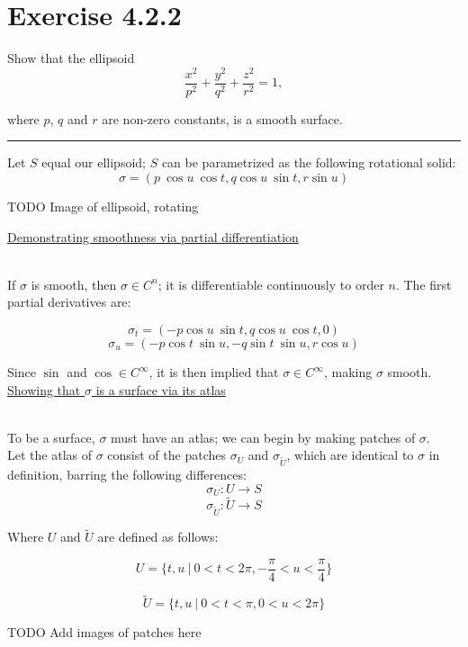 \documentclass[12pt]{article}
\newcommand{\ulind}[1]
{
\noindent
\underline{#1}\\\\
\indent
}
\begin{document}
\maketitle

\section*{Exercise 4.2.2}
Show that the ellipsoid
$$
\frac{x^2}{p^2} + \frac{y^2}{q^2} + \frac{z^2}{r^2} = 1,
$$

where $p$, $q$ and $r$ are non-zero constants, is a smooth surface.

\vspace{1cm}
\hrule
\vspace{1cm}
\noindent

Let $S$ equal our ellipsoid; $S$ can be parametrized as the following rotational solid:
$$
\sigma = (p \ \cos u \ \cos t, q \cos u \ \sin t, r \sin u)
$$

TODO
Image of ellipsoid, rotating

\ulind{Demonstrating smoothness via partial differentiation}
If $\sigma$ is smooth, then $\sigma \in C^n$; it is differentiable continuously to order $n$. The first partial derivatives are:

$$
\sigma_t = (-p \cos u \ \sin t, q \cos u \ \cos t, 0)
$$
$$
\sigma_u = (-p \cos t \ \sin u, -q \sin t \ \sin u, r \cos u)
$$

Since $\sin $ and $\cos \in C^\infty$, it is then implied that $\sigma \in C^\infty$, making $\sigma$ smooth.\\

\ulind{Showing that $\sigma$ is a surface via its atlas}
To be a surface, $\sigma$ must have an atlas; we can begin by making patches of $\sigma$.\\

\clearpage 
Let the atlas of $\sigma$ consist of the patches $\sigma_U$ and $\sigma_{\widetilde U}$, which are identical to $\sigma$ in definition, barring the following differences:\\

$$
\sigma_{U} : U \rightarrow S
$$
$$
\sigma_{\widetilde U} : \widetilde U \rightarrow S
$$

Where $U$ and $\widetilde U$ are defined as follows:

$$
U = \lbrace t, u \ | \ 0 < t < 2 \pi, -\frac{\pi}{4} < u < \frac{\pi}{4} \rbrace
$$

$$
\widetilde U = \lbrace t, u \ | \ 0 < t < \pi, 0 < u < 2 \pi \rbrace
$$

TODO
Add images of patches here
\end{document}
